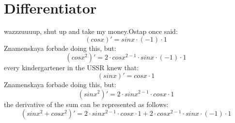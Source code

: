 \documentclass{article}
\begin{document}
\section{Differentiator}
wazzzuuuup, shut up and take my money.\newline Ostap once said: $$ ({cos  {  x  } })' = { {  { sin  {  x  }  }  \cdot  {  (  -1  )  }  }  \cdot  {  1  } } $$
Znamenskaya forbade doing this, but: $$ ({ { cos  {  x  }  }  ^  {  2  } })' = { {  {  2  }  \cdot  {  { cos  {  x  }  }  ^  {  {  2  }  -  {  1  }  }  }  }  \cdot  {  {  { sin  {  x  }  }  \cdot  {  (  -1  )  }  }  \cdot  {  1  }  } } $$
every kindergartener in the USSR knew that: $$ ({sin  {  x  } })' = { { cos  {  x  }  }  \cdot  {  1  } } $$
Znamenskaya forbade doing this, but: $$ ({ { sin  {  x  }  }  ^  {  2  } })' = { {  {  2  }  \cdot  {  { sin  {  x  }  }  ^  {  {  2  }  -  {  1  }  }  }  }  \cdot  {  { cos  {  x  }  }  \cdot  {  1  }  } } $$
the derivative of the sum can be represented as follows: $$ ({ {  { sin  {  x  }  }  ^  {  2  }  }  +  {  { cos  {  x  }  }  ^  {  2  }  } })' = { {  {  {  2  }  \cdot  {  { sin  {  x  }  }  ^  {  {  2  }  -  {  1  }  }  }  }  \cdot  {  { cos  {  x  }  }  \cdot  {  1  }  }  }  +  {  {  {  2  }  \cdot  {  { cos  {  x  }  }  ^  {  {  2  }  -  {  1  }  }  }  }  \cdot  {  {  { sin  {  x  }  }  \cdot  {  (  -1  )  }  }  \cdot  {  1  }  }  } } $$
\end{document}
